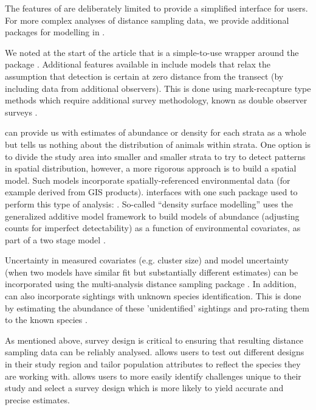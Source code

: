 \documentclass[article]{jss}\usepackage[]{graphicx}\usepackage[]{color}
\begin{document}
The features of  are deliberately limited to provide a simplified interface for users. For more complex analyses of distance sampling data, we provide additional packages for modelling in .

We noted at the start of the article that  is a simple-to-use wrapper around the package . Additional features available in  include  models that relax the assumption that detection is certain at zero distance from the transect (by including data from additional observers). This is done using mark-recapture type methods which require additional survey methodology, known as double observer surveys \citep[see][for an introduction]{Burt:2014gu}.

 can provide us with estimates of abundance or density for each strata as a whole but tells us nothing about the distribution of animals within strata. One option is to divide the study area into smaller and smaller strata to try to detect patterns in spatial distribution, however, a more rigorous approach is to build a spatial model. Such models incorporate spatially-referenced environmental data (for example derived from GIS products).  interfaces with one such package used to perform this type of analysis:  \citep{dsm-pkg}. So-called ``density surface modelling'' uses the generalized additive model framework \citep[e.g.][]{Wood:2006vg} to build models of abundance (adjusting counts for imperfect detectability) as a function of environmental covariates, as part of a two stage model \citep{Hedley:2004et, Miller:2013fq}.

Uncertainty in measured covariates (e.g. cluster size) and model uncertainty (when two models have similar fit but substantially different estimates) can be incorporated using the multi-analysis distance sampling package  \citep{mads-pkg}. In addition,  can also incorporate sightings with unknown species identification. This is done by estimating the abundance of these 'unidentified' sightings and pro-rating them to the known species \citep{Gerrodette:2005}.

As mentioned above, survey design is critical to ensuring that resulting distance sampling data can be reliably analysed.  allows users to test out different designs in their study region and tailor population attributes to reflect the species they are working with.  \citep{DSsim-pkg} allows users to more easily identify challenges unique to their study and select a survey design which is more likely to yield accurate and precise estimates. 
\end{document}
